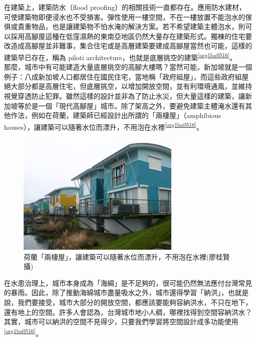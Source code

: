 \documentclass[a4paper,12pt]{article}
\begin{document}
在建築上，建築防水（flood proofing）的相關技術一直都存在。應用防水建材，可使建築物即便浸水也不受損害。彈性使用一樓空間，不在一樓放置不能泡水的傢俱或貴重物品，也是讓建築物不怕水淹的解決方案。若不希望建築主體泡水，則可以採用高腳屋這種在低窪濕熱的東南亞地區仍然大量存在建築形式。獨棟的住宅要改造成高腳屋並非難事，集合住宅或是高層建築要建成高腳屋當然也可能，這樣的建築早已存在，稱為 piloti architecture，也就是底層挑空的建築\textsuperscript{\ref{org1ba0516}}。\\

那麼，城市中有可能建造大量底層挑空的高腳大樓嗎？當然可能，新加坡就是一個例子：八成新加坡人口都居住在國民住宅，當地稱「政府組屋」，而這些政府組屋絕大部分都是高層住宅，但底層挑空，以增加開放空間，並有利環境通風，並維持視覺穿透防止犯罪。雖然這樣的設計並非為了防止水災，但大量這樣的建築，讓新加坡等於是一個「現代高腳屋」城市。除了架高之外，要避免建築主體淹水還有其他作法，例如在荷蘭，建築師已經設計出所謂的「兩棲屋」（amphibious houses），讓建築可以隨著水位而漂升，不用泡在水裡\textsuperscript{\ref{org1ba0516}}。\\

\begin{figure}[htbp]
\centering
\includegraphics[width=300]{images/161236830092580_P3592755.png}
\caption{\label{fig:FigName}荷蘭「兩棲屋」，讓建築可以隨著水位而漂升，不用泡在水裡(廖桂賢攝)}
\end{figure}

在水患治理上，城市本身成為「海綿」是不足夠的，很可能仍然無法應付台灣常見的暴雨。因此，除了推動海綿城市盡量吸水之外，城市還得學習「納洪」，也就是說，我們要接受，城市大部分的開放空間，都應該要能夠容納洪水，不只在地下，還有地上的空間。許多人會認為，台灣城市地小人稠，哪裡找得到空間容納洪水？其實，城市可以納洪的空間不見得少，只要我們學習將空間設計成多功能使用\textsuperscript{\ref{org1ba0516}}。\\
\end{document}

